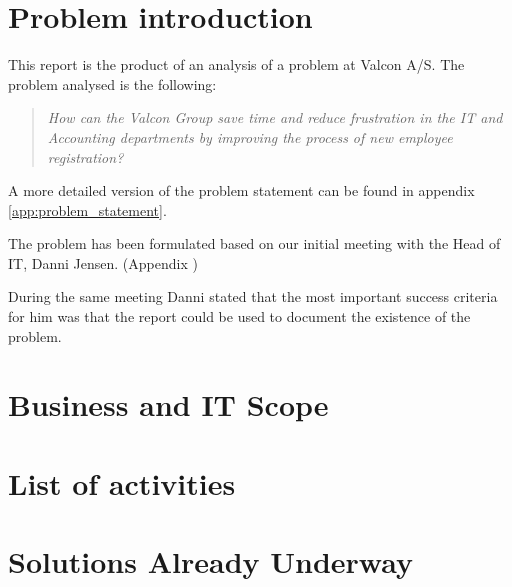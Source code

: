 \section{Problem introduction}
This report is the product of an analysis of a problem at Valcon A/S.
The problem analysed is the following:

\begin{quotation}
\emph{How can the Valcon Group save time and reduce frustration in the IT and Accounting departments by improving the process of new employee registration?}
\end{quotation}

\noindent A more detailed version of the problem statement can be found in appendix \ref{app:problem_statement}.

The problem has been formulated based on our initial meeting with the Head of IT, Danni Jensen. (Appendix )

During the same meeting Danni stated that the most important success criteria for him was that the report could be used to document the existence of the problem.

\section{Business and IT Scope}


\section{List of activities}


\section{Solutions Already Underway}
